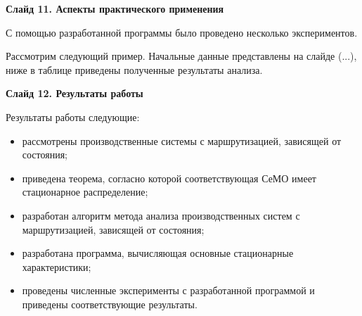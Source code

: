 \documentclass[a4paper,14pt]{extarticle}
\theoremstyle{note}
\begin{document}

\textbf{Слайд 11. Аспекты практического применения}

С помощью разработанной программы было проведено несколько экспериментов.

Рассмотрим следующий пример. Начальные данные представлены на слайде (...), ниже в таблице приведены полученные результаты анализа.


\textbf{Слайд 12. Результаты работы}

Результаты работы следующие:

\begin{itemize}
\item рассмотрены производственные системы с маршрутизацией, зависящей от состояния;
\item приведена теорема, согласно которой соответствующая СеМО имеет стационарное распределение;
\item разработан алгоритм метода анализа производственных систем с маршрутизацией, зависящей от состояния;
\item разработана программа, вычисляющая основные стационарные характеристики;
\item проведены численные эксперименты с разработанной программой и приведены соответствующие результаты.
\end{itemize}
\end{document}

